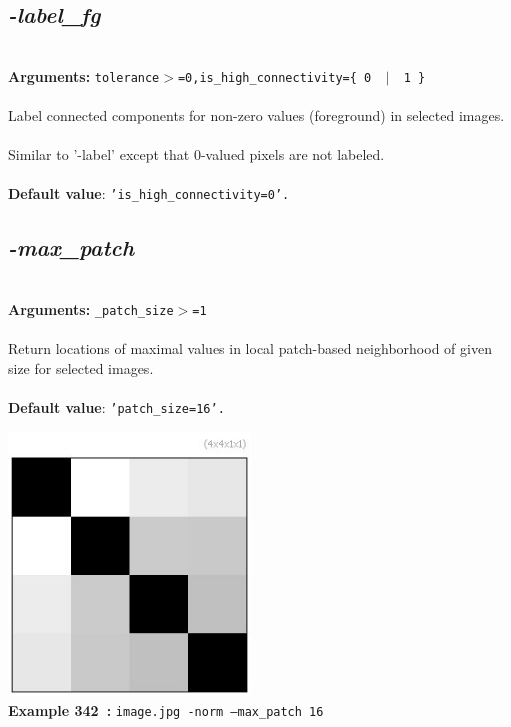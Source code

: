 \documentclass[a4paper,11pt,twoside]{book}
\begin{document}
\subsection{\emph{-label\_fg} }\vspace*{-0.5em}
~\\\textbf{Arguments: } 
{\small \texttt{tolerance$>$=0,is\_high\_connectivity=\{ 0 ~$|$~ 1 \}}}\\~\\
Label connected components for non-zero values (foreground) in selected images.
~\\Similar to '-label' except that 0-valued pixels are not labeled.
~\\~\\\textbf{Default value}: {\small \texttt{'is\_high\_connectivity=0'.}}


\subsection{\emph{-max\_patch} }\vspace*{-0.5em}
~\\\textbf{Arguments: } 
{\small \texttt{\_patch\_size$>$=1}}\\~\\
Return locations of maximal values in local patch-based neighborhood of given size for selected images.
~\\~\\\textbf{Default value}: {\small \texttt{'patch\_size=16'.}}
\begin{center}\includegraphics[keepaspectratio=true,height=7cm,width=\textwidth]{img/gmic_def342.jpg}\\
{\footnotesize \textbf{Example 342~:} \texttt{image.jpg -norm --max\_patch 16}}
\end{center}
\end{document}
